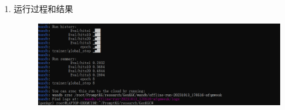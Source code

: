 \documentclass{article}
\begin{document}
\begin{enumerate}
    \item 运行过程和结果
\begin{figure}[htp]
    \centering
    \includegraphics[width=16cm]{最终结果.png}
    \caption{}
    \label{pic7}
\end{figure}
\end{enumerate}
\end{document}
